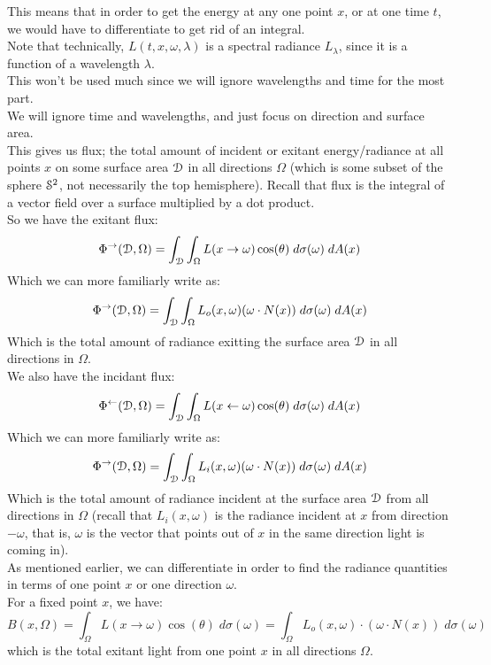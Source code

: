 \documentclass[12pt]{article}
\begin{document}
This means that in order to get the energy
at any one point $x$, or at one time $t$,
we would have to differentiate to get rid
of an integral. \\

Note that technically, $L(t, x, \omega, \lambda)$
is a spectral radiance $L_\lambda$, 
since it is a function
of a wavelength $\lambda$. \\
This won't be used much since we will
ignore wavelengths and time for the most part. \\

We will ignore time and wavelengths,
and just focus on direction and surface area. \\
This gives us flux;
the total amount of incident or exitant
energy/radiance at all points $x$
on some surface area $\mathcal{D}$ in all directions
$\Omega$ (which is some subset of the sphere $\mathcal{S}^2$,
not necessarily the top hemisphere). 
Recall that flux is the integral of a vector
field over a surface multiplied by a dot product. \\ 

So we have the exitant flux:
\[ \Phi^{\to}(\mathcal{D}, \Omega)
= \int_{\mathcal{D}} \int_\Omega L(x \to \omega) \cos(\theta) \;
d\sigma(\omega) \; dA(x) \]
Which we can more familiarly write as:
\[ \Phi^{\to}(\mathcal{D}, \Omega) 
= \int_{\mathcal{D}} \int_\Omega L_o(x, \omega) 
(\omega \cdot N(x)) \; d\sigma(\omega) \; dA(x)  \]
Which is the total amount of radiance exitting
the surface area $\mathcal{D}$ in all directions 
in $\Omega$. \\

We also have the incidant flux:
\[ \Phi^{\leftarrow}(\mathcal{D}, \Omega)
= \int_{\mathcal{D}} \int_\Omega L(x \leftarrow \omega) \cos(\theta) \;
d\sigma(\omega) \; dA(x) \]
Which we can more familiarly write as:
\[ \Phi^{\to}(\mathcal{D}, \Omega) 
= \int_{\mathcal{D}} \int_\Omega L_i(x, \omega) 
(\omega \cdot N(x)) \; d\sigma(\omega) \; dA(x)  \]
Which is the total amount of radiance incident
at the surface area $\mathcal{D}$ from all directions 
in $\Omega$ (recall that $L_i(x, \omega)$ 
is the radiance incident at $x$ from direction $-\omega$,
that is, $\omega$ is the vector that points out of
$x$ in the same direction light is coming in). \\

As mentioned earlier, we can differentiate in order
to find the radiance quantities in terms of one
point $x$ or one direction $\omega$. \\

For a fixed point $x$, we have:
\[ B(x, \Omega) = \int_\Omega L(x \to \omega) \cos(\theta) \;
d\sigma(\omega) = \int_\Omega L_o(x, \omega) \cdot 
(\omega \cdot N(x)) \; d\sigma(\omega) \]
which is the total exitant light from one point $x$
in all directions $\Omega$. \\
\end{document}

